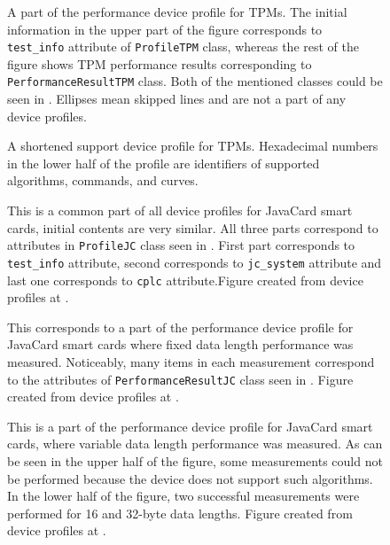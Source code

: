 \begin{figure}
    \centering
    
    \caption{A part of the performance device profile for TPMs. The initial information in the upper part of the figure corresponds to \texttt{test\_info} attribute of \texttt{ProfileTPM} class, whereas the rest of the figure shows TPM performance results corresponding to \texttt{PerformanceResultTPM} class. Both of the mentioned classes could be seen in . Ellipses mean skipped lines and are not a part of any device profiles.}
\end{figure}

\begin{figure}
    \centering
    
    \caption{A shortened support device profile for TPMs. Hexadecimal numbers in the lower half of the profile are identifiers of supported algorithms, commands, and curves.}
\end{figure}

\begin{figure}
    \centering
    
    \caption{This is a common part of all device profiles for JavaCard smart cards, initial contents are very similar. All three parts correspond to attributes in \texttt{ProfileJC} class seen in . First part corresponds to \texttt{test\_info} attribute, second corresponds to \texttt{jc\_system} attribute and last one corresponds to \texttt{cplc} attribute.Figure created from device profiles at \cite{jcalgtestResultsRepo}.}
\end{figure}

\begin{figure}
    \centering
    
    \caption{This corresponds to a part of the performance device profile for JavaCard smart cards where fixed data length performance was measured. Noticeably, many items in each measurement correspond to the attributes of \texttt{PerformanceResultJC} class seen in . Figure created from device profiles at \cite{jcalgtestResultsRepo}.}
\end{figure}

\begin{figure}
    \centering
    
    \caption{This is a part of the performance device profile for JavaCard smart cards, where variable data length performance was measured. As can be seen in the upper half of the figure, some measurements could not be performed because the device does not support such algorithms. In the lower half of the figure, two successful measurements were performed for 16 and 32-byte data lengths. Figure created from device profiles at \cite{jcalgtestResultsRepo}.}
\end{figure}

